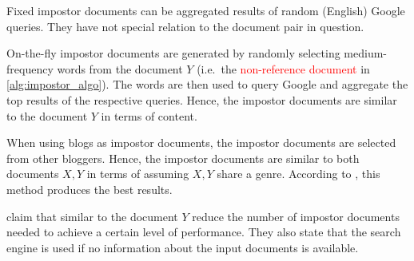 Fixed impostor documents can be aggregated results of random (English) Google queries.
They have not special relation to the document pair in question.

On-the-fly impostor documents are generated by randomly selecting medium-frequency words from the document $Y$ (i.e.\ the \textcolor{red}{non-reference document} in \autoref{alg:impostor_algo}).
The words are then used to query Google and aggregate the top results of the respective queries. 
Hence, the impostor documents are similar to the document $Y$ in terms of content.

When using blogs as impostor documents, the impostor documents are selected from other bloggers. 
Hence, the impostor documents are similar to both documents $X,Y$ in terms of assuming $X,Y$ share a genre.
According to \citet{koppel_determining_2014}, this method produces the best results.

\citet{koppel_determining_2014} claim that similar \imps{} to the document $Y$ reduce the number of impostor documents needed to achieve a certain level of performance.
They also state that the search engine is used if no information about the input documents is available.